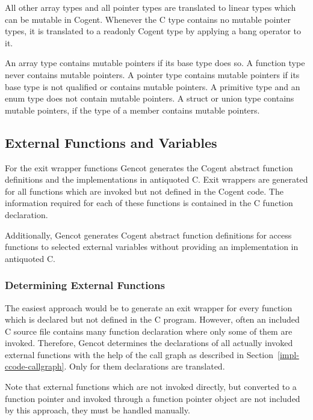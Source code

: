 All other array types and all pointer types are translated to linear types which can be mutable in
Cogent. Whenever the C type contains no mutable pointer types, it is translated to a readonly Cogent type by 
applying a bang operator to it.

An array type contains mutable pointers if its base type does so. A function type never contains mutable pointers.
A pointer type contains mutable pointers if its base type is not  qualified or contains mutable pointers.
A primitive type and an enum type does not contain mutable pointers. A struct or union type contains mutable 
pointers, if the type of a member contains mutable pointers.

\subsection{External Functions and Variables}
\label{impl-ccomps-externs}

For the exit wrapper functions Gencot generates the Cogent abstract function definitions and the implementations
in antiquoted C. Exit wrappers are generated for all functions which are invoked but not defined in the Cogent code. 
The information required for each of these functions is contained in the C function declaration.

Additionally, Gencot generates Cogent abstract function definitions for access functions to selected external
variables without providing an implementation in antiquoted C.

\subsubsection{Determining External Functions}

The easiest approach would be to generate an exit wrapper for every function which is declared but 
not defined in the C program. However, often an
included C source file contains many function declaration where only some of them are invoked. Therefore, Gencot
determines the declarations of all actually invoked external functions with the help of the call graph as described in 
Section~\ref{impl-ccode-callgraph}. Only for them declarations are translated.

Note that external functions which are not invoked directly, but converted to a function pointer and invoked 
through a function pointer object are not included by this approach, they must be handled manually.

